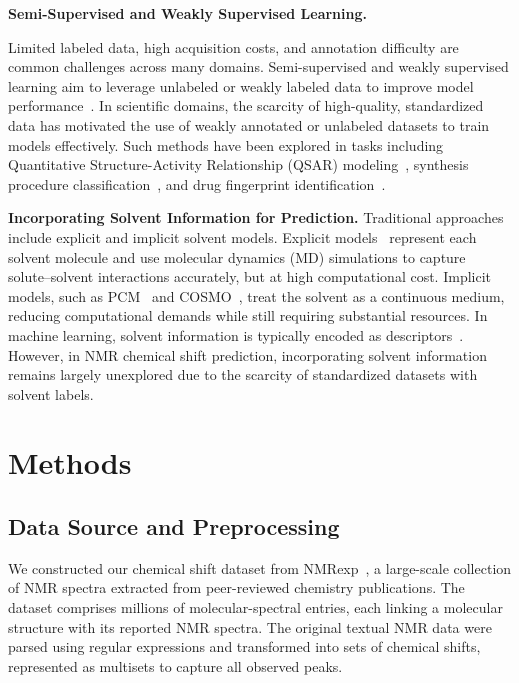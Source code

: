 \textbf{Semi-Supervised and Weakly Supervised Learning.}

Limited labeled data, high acquisition costs, and annotation difficulty are common challenges across many domains. 
Semi-supervised and weakly supervised learning aim to leverage unlabeled or weakly labeled data to improve model performance~\cite{van2020survey, zhou2018brief}. 
In scientific domains, the scarcity of high-quality, standardized data has motivated the use of weakly annotated or unlabeled datasets to train models effectively. Such methods have been explored in tasks including Quantitative Structure-Activity Relationship (QSAR) modeling~\cite{chen2021chemical, kwon2022harnessing}, synthesis procedure classification~\cite{huo2019semi}, and drug fingerprint identification~\cite{shi2023weakly}.


\textbf{Incorporating Solvent Information for Prediction.}  
Traditional approaches include explicit and implicit solvent models. Explicit models~\cite{mark2001structure} represent each solvent molecule and use molecular dynamics (MD) simulations to capture solute–solvent interactions accurately, but at high computational cost. Implicit models, such as PCM~\cite{mennucci2012polarizable} and COSMO~\cite{klamt2011cosmo}, treat the solvent as a continuous medium, reducing computational demands while still requiring substantial resources. In machine learning, solvent information is typically encoded as descriptors~\cite{li2025transpeaknet}. 
However, in NMR chemical shift prediction, incorporating solvent information remains largely unexplored due to the scarcity of standardized datasets with solvent labels.


\section{Methods} \label{sec:method}


\subsection{Data Source and Preprocessing}

We constructed our chemical shift dataset from NMRexp~\cite{wang2025nmrexp}, a large-scale collection of NMR spectra extracted from peer-reviewed chemistry publications. The dataset comprises millions of molecular-spectral entries, each linking a molecular structure with its reported NMR spectra. The original textual NMR data were parsed using regular expressions and transformed into sets of chemical shifts, represented as multisets to capture all observed peaks.

